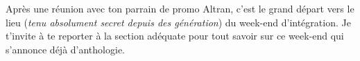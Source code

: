Après une réunion avec ton parrain de promo Altran, c'est le grand départ
vers le lieu (\emph{tenu absolument secret depuis des génération}) du week-end
d'intégration. Je t'invite à te reporter à la section adéquate pour tout
savoir sur ce week-end qui s'annonce déjà d'anthologie. 
